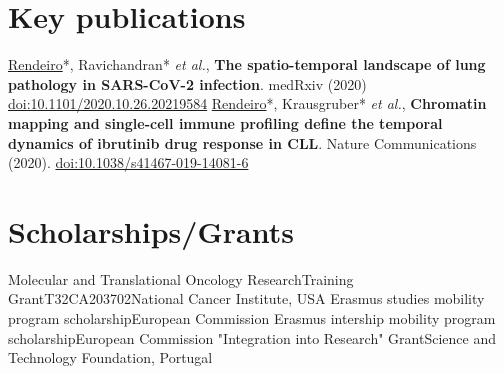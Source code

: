 \documentclass[11pt,a4paper,roman]{moderncv} %
\begin{document}
\section{Key publications}
    \cvitem{}
        {\underline{Rendeiro}*, Ravichandran* \textit{et al.}, \textbf{The spatio-temporal landscape of lung pathology in SARS-CoV-2 infection}. medRxiv (2020) \href{https://dx.doi.org/10.1101/2020.10.26.20219584}{doi:10.1101/2020.10.26.20219584}}
    \cvitem{}
        {\underline{Rendeiro}*, Krausgruber* \textit{et al.}, \textbf{Chromatin mapping and single-cell immune profiling define the temporal dynamics of ibrutinib drug response in CLL}. Nature Communications (2020). \href{https://dx.doi.org/10.1038/s41467-019-14081-6}{doi:10.1038/s41467-019-14081-6}}


\section{Scholarships/Grants}
        {Molecular and Translational Oncology Research}{Training Grant}{T32CA203702}{}{National Cancer Institute, USA}
        {Erasmus studies mobility program scholarship}{}{}{}{European Commission}
        {Erasmus intership mobility program scholarship}{}{}{}{European Commission}
        {"Integration into Research" Grant}{}{}{}{Science and Technology Foundation, Portugal}
\end{document}

